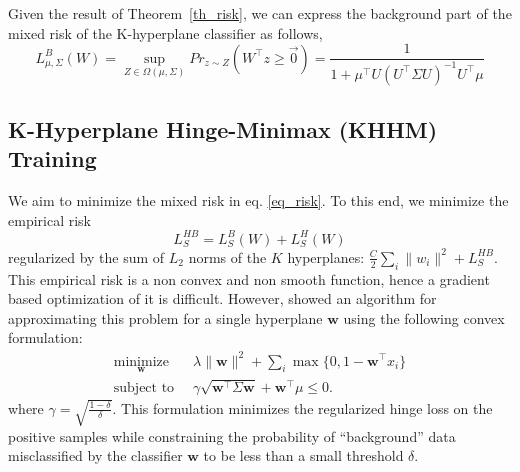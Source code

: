 \documentclass[twoside,11pt]{article}
\begin{document}
Given the result of Theorem~\ref{th_risk}, we can express the background part of the mixed risk of the K-hyperplane classifier as follows,
$$L^{B}_{\mu,\Sigma}(W)= \sup_{Z\in \Omega(\mu, \Sigma)}Pr_{z\sim Z}(W^\top z\geq\vec{0})= \frac{1}{1+\mu^\top U(U^\top  \Sigma U)^{-1}U^\top \mu}$$

\subsection{K-Hyperplane Hinge-Minimax (KHHM) Training} \label{KHHM_Alg}
We aim to minimize the mixed risk in eq. \ref{eq_risk}. To this end, we minimize the empirical risk
\begin{equation}
\label{eq_emp_risk}
L^{HB}_S=L_S^{B}(W)+L_S^{H}(W)
\end{equation}
regularized by the sum of $L_2$ norms of the $K$ hyperplanes: $\frac{C}{2}\sum_i\|w_i\|^2 + L^{HB}_S$.  This empirical risk is a non convex and non smooth function, hence a gradient based optimization of it is difficult. However, \cite{OsadchyKR16}  showed an algorithm for approximating this problem for a single hyperplane $\mathbf{w}$ using the following convex formulation:
\begin{equation}
\begin{aligned}
\underset{\mathbf{w}}{\text{minimize}}
&\;\;\lambda\|\mathbf{w}\|^2+\sum_i \max\{0,1-\mathbf{w}^\top x_i\}\\
\text{subject to}
&\;\;\gamma\sqrt{\mathbf{w}^\top\Sigma\mathbf{w}}+\mathbf{w}^\top\mu\leq 0.
\end{aligned}\label{linear_opt}
\end{equation}
where $\gamma=\sqrt{\frac{1-\delta}{\delta}}$. This formulation minimizes the regularized hinge loss on the positive samples while constraining the probability of ``background'' data misclassified by the classifier $\mathbf{w}$ to be less than a small threshold $\delta$.
\end{document}
